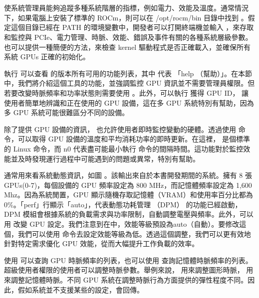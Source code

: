 \section{}

 使系統管理員能夠追蹤多種系統階層的指標，例如電力、效能及溫度。通常情況下，如果電腦上安裝了標準的 ROCm，則可以在 /opt/rocm/bin 目錄中找到 。假定這個目錄已經在 PATH 的環境變數中，開發者可以打開終端機並輸入 ，來存取和監控與 PCIe、電力管理、時脈、效能、錯誤及事件有關的各種系統層級參數。 也可以提供一種簡便的方法，來檢查  kernel 驅動程式是否正確載入，並確保所有系統 GPUs 正確的初始化。

執行  可以查看  的版本所有可用的功能列表，其中  代表 「help （幫助）」。在本節中，我們將介紹這個工具的功能，並強調監控 GPU 資訊並不需要管理員權限。但若要改變時脈頻率和功率狀態則需要使用 。此外，可以執行 獲得 GPU ID， 讓使用者簡單地辨識和正在使用的 GPU 設備，這在多 GPU 系統特別有幫助，因為多 GPU 系統可能很難區分不同的設備。

除了提供 GPU 設備的資訊， 也允許使用者即時監控變動的硬體。透過使用  命令，可以取得 GPU 設備的溫度和平均消耗功率的即時更新。在這裡， 是個標準的 Linux 命令，而 n0 代表盡可能最小執行  命令的間隔時間。這功能對於監控效能並及時發現運行過程中可能遇到的問題或異常，特別有幫助。

通常用來看系統動態資訊，如圖 。該輸出來自於本書開發期間的系統。擁有 8 張 GPUs(0-7)，每個設備的 GPU 頻率設定為 800 MHz，而記憶體頻率設定為 1,600 Mhz。因為系統閒置，GPU 顯示隨機存取記憶體（VRAM）和使用率百分比都為 0\%。「perf」行顯示「auto」，代表動態功耗管理 （DPM） 的功能已經啟動，DPM 模組會根據系統的負載需求與功率限制，自動調整電壓與頻率。此外，可以用  改變 GPU 設定。我們注意到在中，效能等級預設為auto（自動）。要修改這個，我們可以使用 命令去設定效能等級為低。透過這個調整，我們可以更有效地針對特定需求優化 GPU 效能，從而大幅提升工作負載的效率。

使用  可以查詢 GPU 時脈頻率的列表，也可以使用  查詢記憶體時脈頻率的列表。超級使用者權限的使用者可以調整時脈參數。舉例來說， 用來調整圖形時脈， 用來調整記憶體時脈。不同 GPU 系統在調整時脈行為方面提供的彈性程度不同。因此，假如系統並不支援某些的設定，會回傳。

